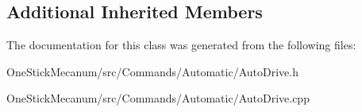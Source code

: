 \subsection*{Additional Inherited Members}


The documentation for this class was generated from the following files\+:\begin{DoxyCompactItemize}
\item 
One\+Stick\+Mecanum/src/\+Commands/\+Automatic/Auto\+Drive.\+h\item 
One\+Stick\+Mecanum/src/\+Commands/\+Automatic/Auto\+Drive.\+cpp\end{DoxyCompactItemize}
